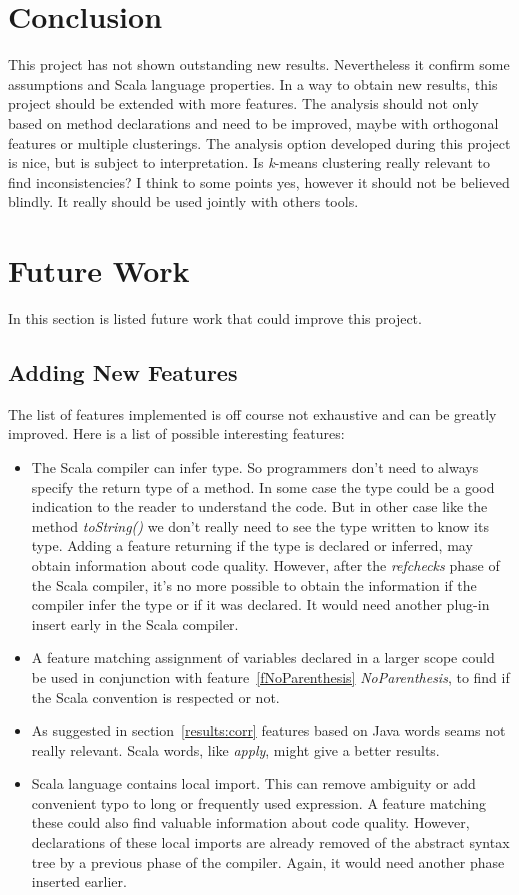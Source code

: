 \documentclass[12pt]{article}
\begin{document}
\section {Conclusion} 
This project has not shown outstanding new results. Nevertheless it confirm some assumptions and Scala language properties. In a way to obtain new results, this project should be extended with more features. The analysis should not only based on method declarations and need to be improved, maybe with orthogonal features or multiple clusterings. The analysis option developed during this project is nice, but is subject to interpretation. Is \textit{k}-means clustering really relevant to find inconsistencies? I think to some points yes, however it should not be believed blindly. It really should be used jointly with others tools.

\section {Future Work}
In this section is listed future work that could improve this project.
\subsection{Adding New Features}
The list of features implemented is off course not exhaustive and can be greatly improved. Here is a list of possible interesting features:
\begin{itemize}
\item The Scala compiler can infer type. So programmers don't need to always specify the return type of a method. In some case the type could be a good indication to the reader to understand the code. But in other case like the method \textit{toString()} we don't really need to see the type written to know its type. Adding a feature returning if the type is declared or inferred, may obtain information about code quality. However, after the \textit{refchecks} phase of the Scala compiler, it's no more possible to obtain the information if the compiler infer the type or if it was declared. It would need another plug-in insert early in the Scala compiler. 
\item A feature matching assignment of variables declared in a larger scope could be used in conjunction with feature~\ref{fNoParenthesis} \textit{NoParenthesis}, to find if the Scala convention is respected or not.
\item As suggested in section~\ref{results:corr} features based on Java words seams not really relevant. Scala words, like \textit{apply}, might give a better results.
\item Scala language contains local import. This can remove ambiguity or add convenient typo to long or frequently used expression. A feature matching these could also find valuable information about code quality. However, declarations of these local imports are already removed of the abstract syntax tree by a previous phase of the compiler. Again, it would need another phase inserted earlier.
\end{itemize}
\end{document}

